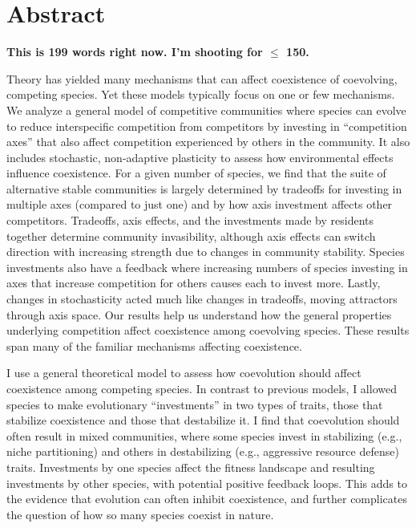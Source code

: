 \section*{Abstract}



\textbf{This is 199 words right now. I'm shooting for $\le$ 150.}


Theory has yielded many mechanisms that can affect coexistence of 
coevolving, competing species. 
Yet these models typically focus on one or few mechanisms. 
We analyze a general model of competitive communities where species can evolve 
to reduce interspecific competition from competitors by investing 
in ``competition axes'' that also affect competition experienced by 
others in the community. 
It also includes stochastic, non-adaptive plasticity to assess how 
environmental effects influence coexistence. 
For a given number of species, we find that the suite of alternative 
stable communities is largely determined 
by tradeoffs for investing in multiple axes (compared to just one) 
and by how axis investment affects other competitors. 
Tradeoffs, axis effects, and the investments made by residents 
together determine community invasibility, 
although axis effects can switch direction with increasing 
strength due to changes in community stability. 
Species investments also have a feedback where increasing numbers 
of species investing in axes that increase competition for others 
causes each to invest more. 
Lastly, changes in stochasticity acted much like changes in 
tradeoffs, moving attractors through axis space. 
Our results help us understand how the general properties underlying 
competition affect coexistence among coevolving species. 
These results span many of the familiar mechanisms affecting coexistence.




I use a general theoretical model to assess how coevolution should  
affect coexistence among competing species. In contrast to previous models,  
I allowed  species to make evolutionary “investments” in two types of  
traits, those that stabilize coexistence and those that destabilize it.  
I find that coevolution should often result in mixed communities,  
where some species invest in stabilizing (e.g., niche partitioning) and  
others in destabilizing (e.g., aggressive resource defense) traits.  
Investments by one species affect the fitness landscape and resulting 
investments by other species, with potential positive feedback loops.  
This adds to the evidence that evolution can often inhibit coexistence,  
and further complicates the question of how so many species coexist in 
nature. 
